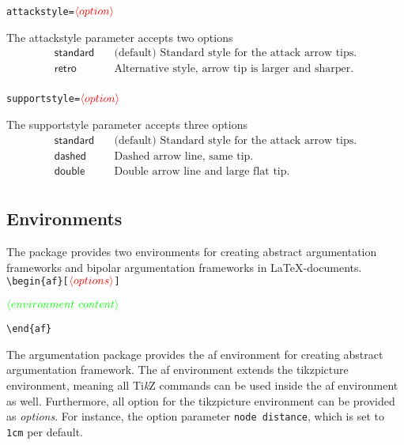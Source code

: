 \documentclass{article}
\newcommand{\tikzname}{Ti\emph{k}Z\xspace}
\newcommand{\opt}[2][red]{\ensuremath{\textcolor{#1}{\langle #2\rangle}}}
\begin{document}
\noindent\texttt{attackstyle=}\opt{option}
    
    The \textsf{attackstyle} parameter accepts two options
    \begin{align*}
        \mathsf{standard} &\quad \text{(default) Standard style for the attack arrow tips.}\\
        \mathsf{retro} &\quad \text{Alternative style, arrow tip is larger and sharper.}\\
    \end{align*}

\noindent\texttt{supportstyle=}\opt{option}
    
    The \textsf{supportstyle} parameter accepts three options
    \begin{align*}
        \mathsf{standard} &\quad \text{(default) Standard style for the attack arrow tips.}\\
        \mathsf{dashed} &\quad \text{Dashed arrow line, same tip.}\\
        \mathsf{double} &\quad \text{Double arrow line and large flat tip.}\\
    \end{align*}
    

\subsection{Environments}
The package provides two environments for creating abstract argumentation frameworks and bipolar argumentation frameworks in \LaTeX-documents.\\

\noindent
\verb|\begin{af}[|\opt{options}\verb|]|

\opt[green]{environment~content}

\noindent
\verb|\end{af}|

\begin{list}{}{\leftmargin=\parindent\rightmargin=0pt}
    \item
    The \textsf{argumentation} package provides the \textsf{af} environment for creating abstract argumentation framework.
    The \textsf{af} environment extends the \textsf{tikzpicture} environment, meaning all \tikzname commands can be used inside the \textsf{af} environment as well.
    Furthermore, all option for the \textsf{tikzpicture} environment can be provided as \emph{options}.
    For instance, the option parameter \verb|node distance|, which is set to \verb|1cm| per default.\\
\end{list}
    
\end{document}
